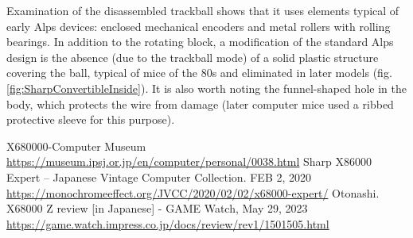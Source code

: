 \documentclass[11pt, a4paper]{article}
\begin{document}
Examination of the disassembled trackball shows that it uses elements typical of early Alps devices: enclosed mechanical encoders and metal rollers with rolling bearings. In addition to the rotating block, a modification of the standard Alps design is the absence (due to the trackball mode) of a solid plastic structure covering the ball, typical of mice of the 80s and eliminated in later models (fig. \ref{fig:SharpConvertibleInside}). It is also worth noting the funnel-shaped hole in the body, which protects the wire from damage (later computer mice used a ribbed protective sleeve for this purpose).

\begin{thebibliography}{9}
 X680000-Computer Museum \url{https://museum.ipsj.or.jp/en/computer/personal/0038.html}
 Sharp X86000 Expert -- Japanese Vintage Computer Collection. FEB 2, 2020 \url{https://monochromeeffect.org/JVCC/2020/02/02/x68000-expert/}
 Otonashi. X68000 Z review [in Japanese] - GAME Watch, May 29, 2023 \url{https://game.watch.impress.co.jp/docs/review/rev1/1501505.html}
\end{thebibliography}
\end{document}
